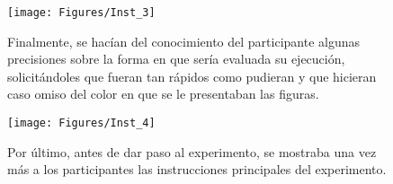 \begin{figure}[th]
\centering
\texttt{[image: Figures/Inst\_3]} 
\decoRule
\caption[Precisiones sobre la evaluación de la ejecución]{Finalmente, se hacían del conocimiento del participante algunas precisiones sobre la forma en que sería evaluada su ejecución, solicitándoles que fueran tan rápidos como pudieran y que hicieran caso omiso del color en que se le presentaban las figuras.}
\label{fig:csv}
\end{figure}

\begin{figure}[th]
\centering
\texttt{[image: Figures/Inst\_4]} 
\decoRule
\caption[Instrucciones finales]{Por último, antes de dar paso al experimento, se mostraba una vez más a los participantes las instrucciones principales del experimento.}
\label{fig:csv}
\end{figure}
